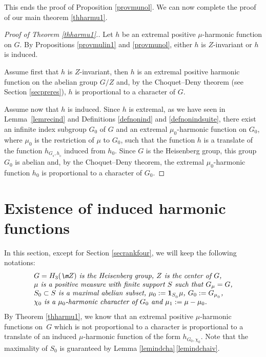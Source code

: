 This ends the proof of Proposition \ref{provmunol}. We can now complete the proof of our main theorem \ref{thharmu1}.

\begin{proof}[Proof of Theorem \ref{thharmu1}.]
Let $h$ be an extremal positive $\mu$-harmonic function on $G$.
By Propositions \ref{provmulin1} and \ref{provmunol}, either $h$ is $Z$-invariant or
$h$ is induced.

Assume first that $h$ is $Z$-invariant, then $h$ is an extremal positive harmonic function
on the abelian group $G/Z$ and, by the Choquet--Deny theorem (see Section \ref{secpreres}),
$h$ is proportional to a character of $G$.

Assume now that $h$ is induced. Since $h$ is extremal,
as we have seen in Lemma~\ref{lemrecind} and Definitions \ref{defnonind} and \ref{defnonindsuite},
there exist an infinite index subgroup
$G_0$ of $G$ and an extremal $\mu_0$-harmonic function on $G_0$,
where $\mu_0$ is the restriction of $\mu$ to $G_0$,
such that the function $h$ is a translate of the function $h_{G_{_0},h_{_0}}$ induced from $h_0$.
Since $G$ is the Heisenberg group, this group $G_0$ is abelian
and, by the Choquet--Deny theorem, the extremal $\mu_0$-harmonic function $h_0$ is proportional to a character of $G_0$.
\end{proof}

\section{Existence of induced harmonic functions}
\label{secexiind}

In this section, except for Section \ref{secrankfour}, we will keep the following notations:
\begin{equation}
\label{eqnnotbul}
\begin{array}{l}
\textit{$G=H_3(\m Z)$ is the Heisenberg group,
$Z$ is the center of $G$,}\\
\textit{$\mu$ is a positive measure with finite support $S$
such that $G_\mu=G$,}\\
\textit{$S_0\subset S$ is a maximal abelian subset, $\mu_0:=\mathbf{1}_{S_{_0}}\mu$,
$G_0:=G_{\mu_{_0}}$,}\\
\textit{$\chi_0$ is a $\mu_0$-harmonic character of $G_0$ and $\mu_1:=\mu-\mu_0$.}
\end{array}
\end{equation}
By Theorem \ref{thharmu1}, we know that an extremal positive $\mu$-harmonic functions
on~$G$ which is not proportional to a character is proportional to
a translate of an induced $\mu$\nobreakdash-harmonic function of the form $h_{G_0,\chi_0}$.
Note that the maximality of $S_0$ is guaranteed by Lemma \ref{lemindcha}\,\eqref{lemindchaiv}.

